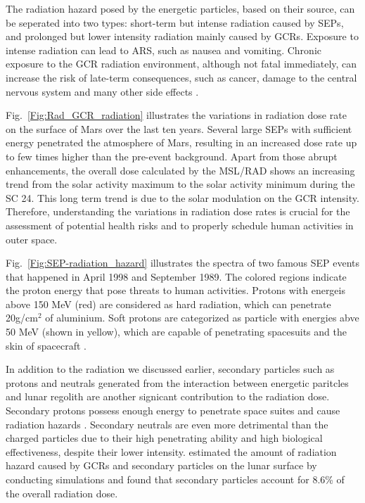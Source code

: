 
The radiation hazard posed by the energetic particles, based on their source, can be seperated into two types: short-term but intense radiation caused by \acp{SEP}, and prolonged but lower intensity radiation mainly caused by \acp{GCR}.
Exposure to intense radiation can lead to \ac{ARS}, such as nausea and vomiting. Chronic exposure to the \ac{GCR} radiation environment, although not fatal immediately, can increase the risk of late-term consequences, such as cancer, damage to the central nervous system and many other side effects \citep{Guo2021AARv_rad, cucinotta2006cancer, Kennedy2014LSSR, Iancu2018Frontiers}. 



Fig.~\ref{Fig:Rad_GCR_radiation} illustrates the variations in radiation dose rate on the surface of Mars over the last ten years. Several large \acp{SEP} with sufficient energy penetrated the atmosphere of Mars, resulting in an increased dose rate up to few times higher than the pre-event background. Apart from those abrupt enhancements, the overall dose calculated by the \ac{MSL}/\ac{RAD} shows an increasing trend from the solar activity maximum to the solar activity minimum during the \ac{SC} 24. This long term trend is due to the solar modulation on the \ac{GCR} intensity.
Therefore, understanding the variations in radiation dose rates is crucial for the assessment of potential health risks and to properly schedule human activities in outer space. 


Fig.~\ref{Fig:SEP-radiation_hazard} illustrates the spectra of two famous \ac{SEP} events that happened in April 1998 and September 1989. The colored regions indicate the proton energy that pose threats to human activities. Protons with energeis above 150 MeV (red) are considered as hard radiation, which can penetrate 20g/cm$^2$ of aluminium. Soft protons are categorized as particle with energies abve 50 MeV (shown in yellow), which are capable of penetrating spacesuits and the skin of spacecraft \citep{Reames2021LNP}. 

In addition to the radiation we discussed earlier, secondary particles such as protons and neutrals generated from the interaction between energetic paritcles and lunar regolith are another signicant contribution to the radiation dose. Secondary protons possess enough energy to penetrate space suites and cause radiation hazards \citep{Xu2022FrASS}. Secondary neutrals are even more detrimental than the charged particles due to their high penetrating ability and high biological effectiveness, despite their lower intensity.
\citet{Spence2013} estimated the amount of radiation hazard caused by \acp{GCR} and secondary particles on the lunar surface by conducting simulations and found that secondary particles account for 8.6\% of the overall radiation dose.

